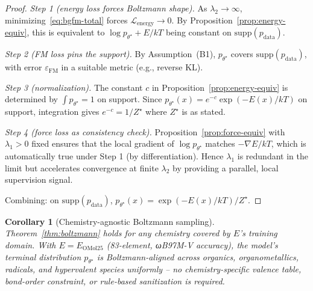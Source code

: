 \documentclass[11pt]{article}
\newtheorem{corollary}[theorem]{Corollary}
\theoremstyle{remark}
\theoremstyle{plain}
\newcommand{\FM}{\mathrm{FM}}
\newcommand{\energy}{\mathrm{energy}}
\begin{document}
\begin{proof}
\emph{Step 1 (energy loss forces Boltzmann shape).} As $\lambda_2 \to
\infty$, minimizing~\eqref{eq:bgfm-total} forces $\mathcal{L}_\energy
\to 0$. By Proposition~\ref{prop:energy-equiv}, this is equivalent to
$\log p_{\theta^\star} + E/kT$ being constant on $\mathrm{supp}(p_\text{data})$.

\emph{Step 2 (FM loss pins the support).} By Assumption~(B1),
$p_{\theta^\star}$ covers $\mathrm{supp}(p_\text{data})$, with error
$\varepsilon_\FM$ in a suitable metric (e.g., reverse KL).

\emph{Step 3 (normalization).} The constant $c$ in
Proposition~\ref{prop:energy-equiv} is determined by $\int p_{\theta^\star} = 1$
on support. Since $p_{\theta^\star}(x) = e^{-c} \exp(-E(x)/kT)$ on
support, integration gives $e^{-c} = 1/Z^\star$ where $Z^\star$ is as
stated.

\emph{Step 4 (force loss as consistency check).} Proposition~\ref{prop:force-equiv}
with $\lambda_1 > 0$ fixed ensures that the local gradient of
$\log p_{\theta^\star}$ matches $-\nabla E/kT$, which is automatically
true under Step 1 (by differentiation). Hence $\lambda_1$ is redundant
in the limit but accelerates convergence at finite $\lambda_2$ by
providing a parallel, local supervision signal.

Combining: on $\mathrm{supp}(p_\text{data})$, $p_{\theta^\star}(x) =
\exp(-E(x)/kT)/Z^\star$.
\end{proof}

\begin{corollary}[Chemistry-agnostic Boltzmann sampling]\label{cor:chem-free-boltz}
Theorem~\ref{thm:boltzmann} holds for any chemistry covered by $E$'s
training domain. With $E = E_\text{OMol25}$ (83-element, ωB97M-V
accuracy), the model's terminal distribution $p_{\theta^\star}$ is
Boltzmann-aligned across organics, organometallics, radicals, and
hypervalent species uniformly -- no chemistry-specific valence table,
bond-order constraint, or rule-based sanitization is required.
\end{corollary}
\end{document}
